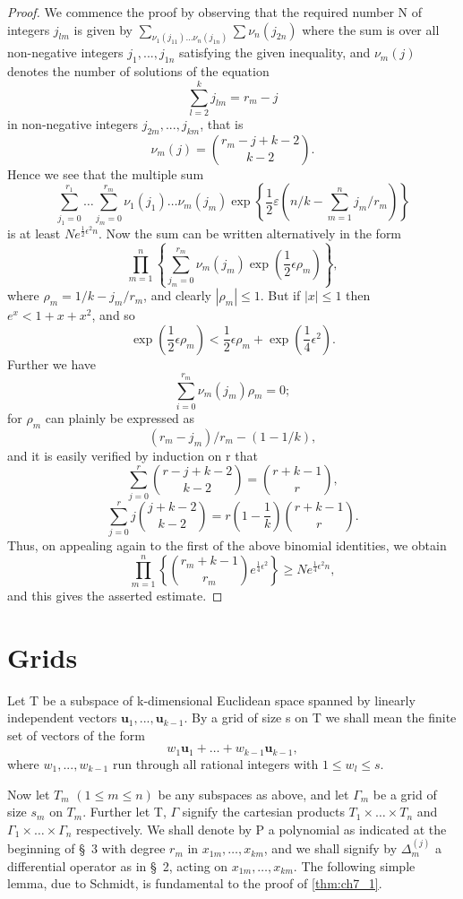 \begin{proof}
We commence the proof by observing that the required number N of integers  $j_{lm}$  is given by  $\sum_{\nu_1(j_{11})\dots\nu_n(j_{1n})} \sum \nu_n(j_{2n})$ where the sum is over all non-negative integers  $j_1, ..., j_{1n}$  satisfying the given inequality, and  $\nu_m(j)$  denotes the number of solutions of the equation
\[\sum_{l=2}^{k} j_{lm} = r_m - j\]
in non-negative integers  $j_{2m},...,j_{km}$, that is
\[\nu_m(j) = \binom{r_m-j+k-2}{k-2}.\]
Hence we see that the multiple sum
\[\sum_{j_1=0}^{r_1} \dots \sum_{j_m=0}^{r_m} \nu_1(j_1) \dots \nu_m(j_m) \exp \left\{ \frac{1}{2} \varepsilon \left( n/k - \sum_{m=1}^n j_m/r_m \right) \right\}\]
is at least  $Ne^{\frac{1}{2}\epsilon^2n}$. Now the sum can be written alternatively in the form
\[\prod_{m=1}^{n} \left\{ \sum_{j_{m}=0}^{r_{m}} \nu_{m}(j_{m}) \exp\left(\frac{1}{2}\epsilon \rho_{m}\right) \right\},\]
where  $\rho_m = 1/k - j_m/r_m$, and clearly  $|\rho_m| \le 1$. But if  $|x| \le 1$  then  $e^x < 1 + x + x^2$, and so
\[\exp\left(\frac{1}{2}\epsilon\rho_m\right) < \frac{1}{2}\epsilon\rho_m + \exp\left(\frac{1}{4}\epsilon^2\right).\]
Further we have
\[\sum_{i=0}^{r_m} \nu_m(j_m) \rho_m = 0;\]
for  $\rho_m$  can plainly be expressed as
\[(r_m - j_m)/r_m - (1 - 1/k),\]
and it is easily verified by induction on r that
\[\sum_{j=0}^{r} \binom{r-j+k-2}{k-2} = \binom{r+k-1}{r},\]
\[\sum_{j=0}^r j \binom{j+k-2}{k-2} = r \left(1-\frac{1}{k}\right) \binom{r+k-1}{r}.\]
Thus, on appealing again to the first of the above binomial identities, we obtain
\[ \prod_{m=1}^{n} \left\{ \binom{r_m + k - 1}{r_m} e^{\frac{1}{4}\epsilon^2} \right\} \geqslant N e^{\frac{1}{4}\epsilon^2 n}, \]
and this gives the asserted estimate.
\end{proof}

\section{Grids}\label{sec:ch7_5}

Let T be a subspace of k-dimensional Euclidean space spanned by linearly independent vectors  $\mathbf{u}_1, ..., \mathbf{u}_{k-1}$. By a grid of size s on T we shall mean the finite set of vectors of the form
\[w_1\mathbf{u}_1+\ldots+w_{k-1}\mathbf{u}_{k-1},\]
where  $w_1, ..., w_{k-1}$  run through all rational integers with  $1 \le w_l \le s$.

Now let  $T_m$   $(1 \le m \le n)$  be any subspaces as above, and let  $\Gamma_m$  be a grid of size  $s_m$  on  $T_m$. Further let T,  $\Gamma$  signify the cartesian products  $T_1 \times \ldots \times T_n$  and  $\Gamma_1 \times \ldots \times \Gamma_n$  respectively. We shall denote by P a polynomial as indicated at the beginning of \S~3 with degree  $r_m$  in  $x_{1m}, \ldots, x_{km}$, and we shall signify by  $\Delta_m^{(j)}$  a differential operator as in \S~2, acting on  $x_{1m}, \ldots, x_{km}$. The following simple lemma, due to Schmidt, is fundamental to the proof of \autoref{thm:ch7_1}.

